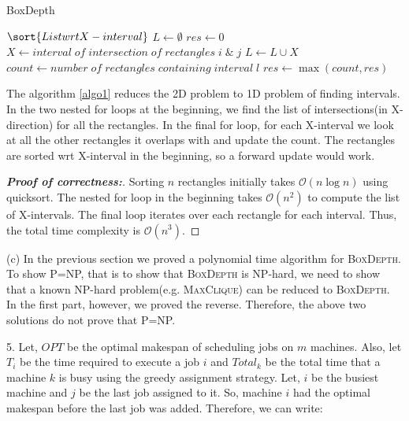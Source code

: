 \documentclass[assign]{article}
\begin{document}
\begin{algorithm}[H]
   \caption{BoxDepth}
    $\sort{List  wrt  X-interval}$\;
    $L \gets \emptyset$\;
    $res \gets 0$\;
       {
          {
              $X \gets interval \; of \; intersection \; of \; rectangles \; i \; \& \; j$\;
              $L \gets L \cup X$
          }
      }
       {
           $count \gets number \; of \; rectangles \; containing \; interval \; l$\;
	    $res \gets \max{(count,res)}$\;
       }
\label{algo1}
\end{algorithm}

The algorithm \ref{algo1} reduces the 2D problem to 1D problem of finding intervals. In the two nested for loops at the beginning, we find the list of intersections(in X-direction) for all the rectangles. In the final for loop, for each X-interval we look at all the other rectangles it overlaps with and update the count. The rectangles are sorted wrt X-interval in the beginning, so a forward update would work.
 \vspace{-5pt}
\begin{proof}[\textbf{Proof of correctness:}]
Sorting $n$ rectangles initially takes $\mathcal{O}(n\log n)$ using quicksort. The nested for loop in the beginning takes $\mathcal{O}(n^2)$ to compute the list of X-intervals. The final loop iterates over each rectangle for each interval. Thus, the total time complexity is $\mathcal{O}(n^3)$.
\end{proof}

\par \noindent (c) In the previous section we proved a polynomial time algorithm for \textsc{BoxDepth}. To show P=NP, that is to show that \textsc{BoxDepth} is NP-hard, we need to show that a known NP-hard problem(e.g. \textsc{MaxClique}) can be reduced to \textsc{BoxDepth}. In the first part, however, we proved the reverse. Therefore, the above two solutions do not prove that P=NP.

\vspace{10pt}

\par 5. Let, $OPT$ be the optimal makespan of scheduling jobs on $m$ machines. Also, let $T_i$ be the time required to execute a job $i$ and $Total_k$ be the total time that a machine $k$ is busy using the greedy assignment strategy.  Let, $i$ be the busiest machine and $j$ be the last job assigned to it. So, machine $i$ had the optimal makespan before the last job was added. Therefore, we can write:
\end{document}
